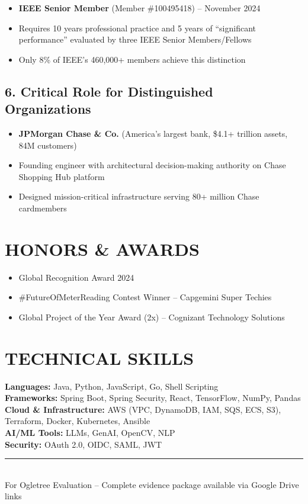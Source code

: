 \documentclass[11pt,letterpaper]{article}
\begin{document}
\begin{itemize}
    \item \textbf{IEEE Senior Member} (Member \#100495418) -- November 2024
    \item Requires 10 years professional practice and 5 years of ``significant performance'' evaluated by three IEEE Senior Members/Fellows
    \item Only 8\% of IEEE's 460,000+ members achieve this distinction
\end{itemize}

\subsection*{6. Critical Role for Distinguished Organizations}

\begin{itemize}
    \item \textbf{JPMorgan Chase \& Co.} (America's largest bank, \$4.1+ trillion assets, 84M customers)
    \item Founding engineer with architectural decision-making authority on Chase Shopping Hub platform
    \item Designed mission-critical infrastructure serving 80+ million Chase cardmembers
\end{itemize}

\section*{HONORS \& AWARDS}

\begin{itemize}
    \item Global Recognition Award 2024
    \item \#FutureOfMeterReading Contest Winner -- Capgemini Super Techies
    \item Global Project of the Year Award (2x) -- Cognizant Technology Solutions
\end{itemize}

\section*{TECHNICAL SKILLS}

\textbf{Languages:} Java, Python, JavaScript, Go, Shell Scripting\\
\textbf{Frameworks:} Spring Boot, Spring Security, React, TensorFlow, NumPy, Pandas\\
\textbf{Cloud \& Infrastructure:} AWS (VPC, DynamoDB, IAM, SQS, ECS, S3), Terraform, Docker, Kubernetes, Ansible\\
\textbf{AI/ML Tools:} LLMs, GenAI, OpenCV, NLP\\
\textbf{Security:} OAuth 2.0, OIDC, SAML, JWT

\vfill
\begin{center}
\rule{0.6\textwidth}{0.4pt}\\
\small{For Ogletree Evaluation -- Complete evidence package available via Google Drive links}
\end{center}
\end{document}

